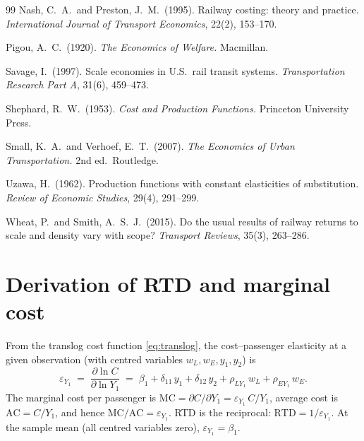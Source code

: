 \documentclass[11pt,a4paper]{article}
\begin{document}
{\begin{thebibliography}{99}
Nash, C.~A.\ and Preston, J.~M.\ (1995).
Railway costing: theory and practice.
\textit{International Journal of Transport Economics}, 22(2), 153--170.

Pigou, A.~C.\ (1920).
\textit{The Economics of Welfare.} Macmillan.

Savage, I.\ (1997).
Scale economies in U.S.\ rail transit systems.
\textit{Transportation Research Part A}, 31(6), 459--473.

Shephard, R.~W.\ (1953).
\textit{Cost and Production Functions.} Princeton University Press.

Small, K.~A.\ and Verhoef, E.~T.\ (2007).
\textit{The Economics of Urban Transportation.} 2nd ed.\ Routledge.

Uzawa, H.\ (1962).
Production functions with constant elasticities of substitution.
\textit{Review of Economic Studies}, 29(4), 291--299.

Wheat, P.\ and Smith, A.~S.~J.\ (2015).
Do the usual results of railway returns to scale and density vary with
scope?
\textit{Transport Reviews}, 35(3), 263--286.

\end{thebibliography}
}

\appendix

\section{Derivation of RTD and marginal cost}
\label{app:derivation}

From the translog cost function \eqref{eq:translog}, the cost--passenger
elasticity at a given observation (with centred variables $w_L, w_E,
y_1, y_2$) is
\begin{equation}
\varepsilon_{Y_1} \;=\; \frac{\partial \ln C}{\partial \ln Y_1}
\;=\; \beta_1 + \delta_{11}\, y_1 + \delta_{12}\, y_2
       + \rho_{LY_1}\, w_L + \rho_{EY_1}\, w_E .
\end{equation}
The marginal cost per passenger is
$\text{MC} = \partial C / \partial Y_1 = \varepsilon_{Y_1}\, C / Y_1$,
average cost is $\text{AC} = C / Y_1$, and hence
$\text{MC}/\text{AC} = \varepsilon_{Y_1}$.
RTD is the reciprocal: $\text{RTD} = 1/\varepsilon_{Y_1}$. At the sample
mean (all centred variables zero), $\varepsilon_{Y_1} = \beta_1$.
\end{document}
